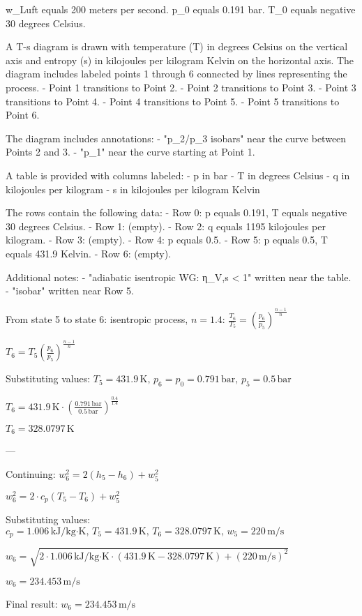 w_Luft equals 200 meters per second.  
p_0 equals 0.191 bar.  
T_0 equals negative 30 degrees Celsius.  

A T-s diagram is drawn with temperature (T) in degrees Celsius on the vertical axis and entropy (s) in kilojoules per kilogram Kelvin on the horizontal axis. The diagram includes labeled points 1 through 6 connected by lines representing the process.  
- Point 1 transitions to Point 2.  
- Point 2 transitions to Point 3.  
- Point 3 transitions to Point 4.  
- Point 4 transitions to Point 5.  
- Point 5 transitions to Point 6.  

The diagram includes annotations:  
- "p_2/p_3 isobars" near the curve between Points 2 and 3.  
- "p_1" near the curve starting at Point 1.  

A table is provided with columns labeled:  
- p in bar  
- T in degrees Celsius  
- q in kilojoules per kilogram  
- s in kilojoules per kilogram Kelvin  

The rows contain the following data:  
- Row 0: p equals 0.191, T equals negative 30 degrees Celsius.  
- Row 1: (empty).  
- Row 2: q equals 1195 kilojoules per kilogram.  
- Row 3: (empty).  
- Row 4: p equals 0.5.  
- Row 5: p equals 0.5, T equals 431.9 Kelvin.  
- Row 6: (empty).  

Additional notes:  
- "adiabatic isentropic WG: η_V,s < 1" written near the table.  
- "isobar" written near Row 5.

From state 5 to state 6: isentropic process, \( n = 1.4 \):  
\( \frac{T_6}{T_5} = \left( \frac{p_6}{p_5} \right)^{\frac{n-1}{n}} \)  

\( T_6 = T_5 \left( \frac{p_6}{p_5} \right)^{\frac{n-1}{n}} \)  

Substituting values:  
\( T_5 = 431.9 \, \text{K}, \, p_6 = p_0 = 0.791 \, \text{bar}, \, p_5 = 0.5 \, \text{bar} \)  

\( T_6 = 431.9 \, \text{K} \cdot \left( \frac{0.791 \, \text{bar}}{0.5 \, \text{bar}} \right)^{\frac{0.4}{1.4}} \)  

\( T_6 = 328.0797 \, \text{K} \)  

---

Continuing:  
\( w_6^2 = 2(h_5 - h_6) + w_5^2 \)  

\( w_6^2 = 2 \cdot c_p(T_5 - T_6) + w_5^2 \)  

Substituting values:  
\( c_p = 1.006 \, \text{kJ/kg·K}, \, T_5 = 431.9 \, \text{K}, \, T_6 = 328.0797 \, \text{K}, \, w_5 = 220 \, \text{m/s} \)  

\( w_6 = \sqrt{2 \cdot 1.006 \, \text{kJ/kg·K} \cdot (431.9 \, \text{K} - 328.0797 \, \text{K}) + (220 \, \text{m/s})^2} \)  

\( w_6 = 234.453 \, \text{m/s} \)  

Final result:  
\( w_6 = 234.453 \, \text{m/s} \)